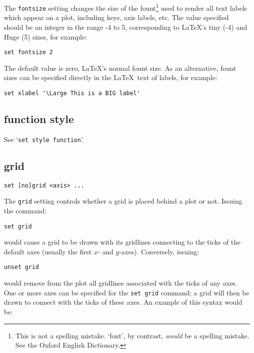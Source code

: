 \documentclass[a4paper,onecolumn,11pt]{book}
\begin{document}
The {\tt fontsize} setting changes the size of the fount\footnote{This is not a
spelling mistake. `font', by contrast, \textit{would} be a spelling mistake. See the
Oxford English Dictionary.} used to render all text labels which appear on a
plot, including keys, axis labels, etc. The value specified should be an integer
in the range -4 to 5, corresponding to \LaTeX's tiny (-4) and Huge (5) sizes,
for example:

\begin{verbatim}
set fontsize 2
\end{verbatim}

The default value is zero, \LaTeX's normal fount size. As an alternative, fount
sizes can be specified directly in the \LaTeX\ text of labels, for example:

\begin{verbatim}
set xlabel '\Large This is a BIG label'
\end{verbatim}

\subsection{function style}

See `{\tt set style function}'.

\subsection{grid}

\begin{verbatim}
set [no]grid <axis> ...
\end{verbatim}

The {\tt grid} setting controls whether a grid is placed behind a plot or not.
Issuing the command:

\begin{verbatim}
set grid
\end{verbatim}

\noindent would cause a grid to be drawn with its gridlines connecting to the ticks of
the default axes (usually the first $x$- and $y$-axes). Conversely, issuing:

\begin{verbatim}
unset grid
\end{verbatim}

\noindent would remove from the plot all gridlines associated with the ticks of any axes.
One or more axes can be specified for the {\tt set grid} command; a grid will
then be drawn to connect with the ticks of these axes. An example of this syntax
would be:
\end{document}
